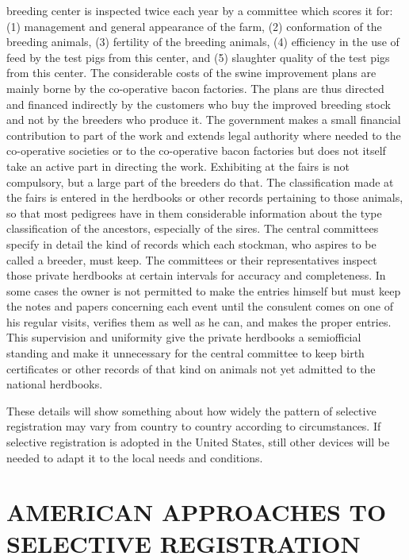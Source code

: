 breeding center is inspected twice each year by a committee which scores it
for: (1) management and general appearance of the farm, (2) conformation of the
breeding animals, (3) fertility of the breeding animals, (4) efficiency in the
use of feed by the test pigs from this center, and (5) slaughter quality of the
test pigs from this center. The considerable costs of the swine improvement plans
are mainly borne by the co-operative bacon factories. The plans are thus directed
and financed indirectly by the customers who buy the improved breeding stock and
not by the breeders who produce it. The government makes a small financial
contribution to part of the work and extends legal authority where needed to the
co-operative societies or to the co-operative bacon factories but does
not itself take an active part in directing the work. Exhibiting at the
fairs is not compulsory, but a large part of the breeders do that. The
classification made at the fairs is entered in the herdbooks or other records
pertaining to those animals, so that most pedigrees have in them
considerable information about the type classification of the ancestors,
especially of the sires. The central committees specify in detail the kind
of records which each stockman, who aspires to be called a breeder,
must keep. The committees or their representatives inspect those private
herdbooks at certain intervals for accuracy and completeness. In
some cases the owner is not permitted to make the entries himself but
must keep the notes and papers concerning each event until the consulent
comes on one of his regular visits, verifies them as well as he can,
and makes the proper entries. This supervision and uniformity give the
private herdbooks a semiofficial standing and make it unnecessary for
the central committee to keep birth certificates or other records of that
kind on animals not yet admitted to the national herdbooks.

These details will show something about how widely the pattern of
selective registration may vary from country to country according to
circumstances. If selective registration is adopted in the United States,
still other devices will be needed to adapt it to the local needs and
conditions.

\section*{AMERICAN APPROACHES TO SELECTIVE REGISTRATION}

